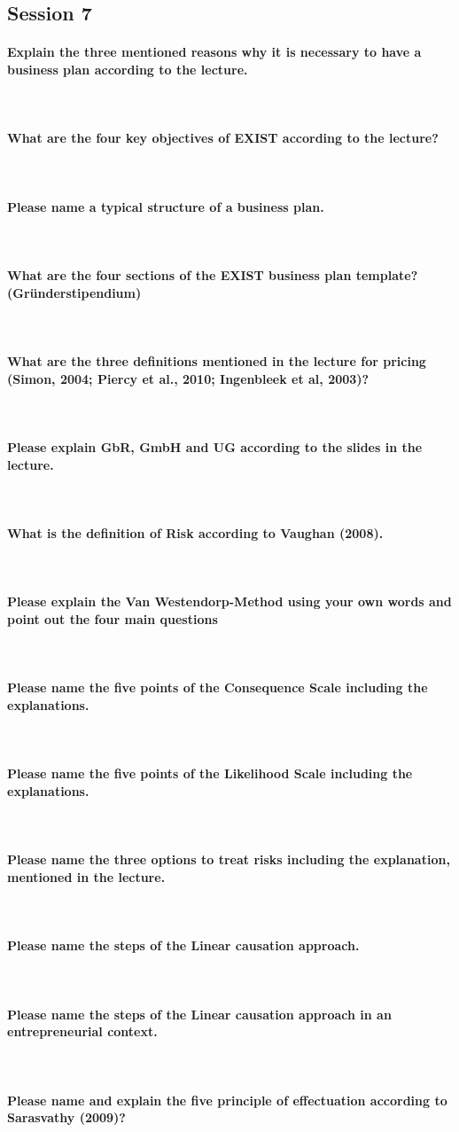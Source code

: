 \documentclass[10pt,a4paper,noendnumber=true]{scrartcl}
\newcommand{\properparagraph}[1]{\paragraph{\textcolor{Emerald}{#1}}\mbox{}\\}
\begin{document}
\subsection{Session 7}
\properparagraph{Explain the three mentioned reasons why it is necessary to have a business plan according to the lecture.}
\properparagraph{What are the four key objectives of EXIST according to the lecture?}
\properparagraph{Please name a typical structure of a business plan.}
\properparagraph{What are the four sections of the EXIST business plan template? (Gründerstipendium)}
\properparagraph{What are the three definitions mentioned in the lecture for pricing (Simon, 2004; Piercy et al.,	2010; Ingenbleek et al, 2003)?}
\properparagraph{Please explain GbR, GmbH and UG according to the slides in the lecture.}
\properparagraph{What is the definition of Risk according to Vaughan (2008).}
\properparagraph{Please explain the Van Westendorp-Method using your own words and point out the four main questions}
\properparagraph{Please name the five points of the Consequence Scale including the explanations.}
\properparagraph{Please name the five points of the Likelihood Scale including the explanations.}
\properparagraph{Please name the three options to treat risks including the explanation, mentioned in the	lecture.}
\properparagraph{Please name the steps of the Linear causation approach.}
\properparagraph{Please name the steps of the Linear causation approach in an entrepreneurial context.}
\properparagraph{Please name and explain the five principle of effectuation according to Sarasvathy (2009)?}
\end{document}
